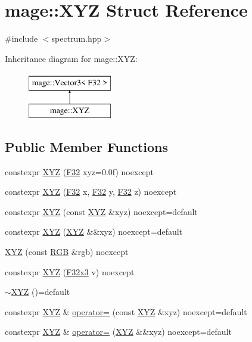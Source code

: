 \hypertarget{structmage_1_1_x_y_z}{}\section{mage\+:\+:X\+YZ Struct Reference}
\label{structmage_1_1_x_y_z}


{\ttfamily \#include $<$spectrum.\+hpp$>$}

Inheritance diagram for mage\+:\+:X\+YZ\+:\begin{figure}[H]
\begin{center}
\leavevmode
\includegraphics[height=2.000000cm]{structmage_1_1_x_y_z}
\end{center}
\end{figure}
\subsection*{Public Member Functions}
\begin{DoxyCompactItemize}
\item 
constexpr \hyperlink{structmage_1_1_x_y_z_af8b9ef53daa7463097c6397644a24ebf}{X\+YZ} (\hyperlink{namespacemage_aa97e833b45f06d60a0a9c4fc22ae02c0}{F32} xyz=0.\+0f) noexcept
\item 
constexpr \hyperlink{structmage_1_1_x_y_z_af1a6e6dd912ef8513640bd7a45af01d5}{X\+YZ} (\hyperlink{namespacemage_aa97e833b45f06d60a0a9c4fc22ae02c0}{F32} x, \hyperlink{namespacemage_aa97e833b45f06d60a0a9c4fc22ae02c0}{F32} y, \hyperlink{namespacemage_aa97e833b45f06d60a0a9c4fc22ae02c0}{F32} z) noexcept
\item 
constexpr \hyperlink{structmage_1_1_x_y_z_a340b36d0ef87c20f3ff4123e71fb6894}{X\+YZ} (const \hyperlink{structmage_1_1_x_y_z}{X\+YZ} \&xyz) noexcept=default
\item 
constexpr \hyperlink{structmage_1_1_x_y_z_abfabc56fbe50948bc3d894178685453a}{X\+YZ} (\hyperlink{structmage_1_1_x_y_z}{X\+YZ} \&\&xyz) noexcept=default
\item 
\hyperlink{structmage_1_1_x_y_z_a7502d9fa2f8d6bf59d00bcdb45c4fcd0}{X\+YZ} (const \hyperlink{structmage_1_1_r_g_b}{R\+GB} \&rgb) noexcept
\item 
constexpr \hyperlink{structmage_1_1_x_y_z_af2edf71f76a8c7d457229adaf904fb07}{X\+YZ} (\hyperlink{namespacemage_a73fbe0da4b8d5bc156bb8453e5b63a17}{F32x3} v) noexcept
\item 
\hyperlink{structmage_1_1_x_y_z_a07eb7ce1ad3308774b0bbad3a7f121ce}{$\sim$\+X\+YZ} ()=default
\item 
constexpr \hyperlink{structmage_1_1_x_y_z}{X\+YZ} \& \hyperlink{structmage_1_1_x_y_z_acf2ea9538d1f6a496557d3d0f2538a0c}{operator=} (const \hyperlink{structmage_1_1_x_y_z}{X\+YZ} \&xyz) noexcept=default
\item 
constexpr \hyperlink{structmage_1_1_x_y_z}{X\+YZ} \& \hyperlink{structmage_1_1_x_y_z_ab162a3b19bdbb5abd84ad77052ac6030}{operator=} (\hyperlink{structmage_1_1_x_y_z}{X\+YZ} \&\&xyz) noexcept=default
\end{DoxyCompactItemize}


